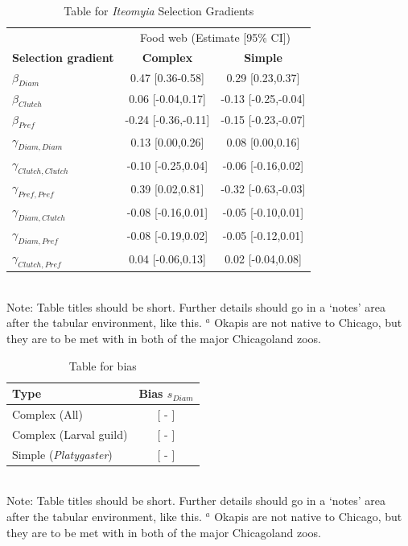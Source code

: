 \documentclass[11pt]{article}
\begin{document}
\begin{table}[h]
\caption{Table for \textit{Iteomyia} Selection Gradients}
\label{Table:Gradients}
\centering
\begin{tabular}{lcc}
                                                                                  \\ \hline
                                  & \multicolumn{2}{c}{Food web (Estimate [95\% CI])} \\
\textbf{Selection gradient}       & \textbf{Complex} & \textbf{Simple}            \\ \hline
$\beta_{Diam}$                    & 0.47 [0.36-0.58] & 0.29 [0.23,0.37] \\
$\beta_{Clutch}$                  & 0.06 [-0.04,0.17] & -0.13 [-0.25,-0.04] \\
$\beta_{Pref}$                    & -0.24 [-0.36,-0.11] & -0.15 [-0.23,-0.07] \\
$\gamma_{Diam,Diam}$              & 0.13 [0.00,0.26] & 0.08 [0.00,0.16] \\
$\gamma_{Clutch,Clutch}$          & -0.10 [-0.25,0.04] & -0.06 [-0.16,0.02] \\
$\gamma_{Pref,Pref}$              & 0.39 [0.02,0.81] & -0.32 [-0.63,-0.03] \\
$\gamma_{Diam,Clutch}$            & -0.08 [-0.16,0.01] & -0.05 [-0.10,0.01] \\
$\gamma_{Diam,Pref}$              & -0.08 [-0.19,0.02] & -0.05 [-0.12,0.01] \\
$\gamma_{Clutch,Pref}$            & 0.04 [-0.06,0.13] & 0.02 [-0.04,0.08]            \\ \hline
\end{tabular}
\bigskip{}
\\
{\footnotesize Note: Table titles should be short. Further details should go in a `notes' area after the tabular environment, like this. $^a$ Okapis are not native to Chicago, but they are to be met with in both of the major Chicagoland zoos.}
\end{table}

\newpage{}

\begin{table}[h]
\caption{Table for bias}
\label{Table:Bias}
\centering
\begin{tabular}{lc}
                                                                  \\ \hline
\textbf{Type}                 & \textbf{Bias} \boldmath$s_{Diam}$ \\ \hline
Complex (All)                 &  [ - ] \\
Complex (Larval guild)        &  [ - ] \\
Simple (\textit{Platygaster}) &  [ - ]                  \\ \hline
\end{tabular}
\bigskip{}
\\
{\footnotesize Note: Table titles should be short. Further details should go in a `notes' area after the tabular environment, like this. $^a$ Okapis are not native to Chicago, but they are to be met with in both of the major Chicagoland zoos.}
\end{table}
\end{document}
